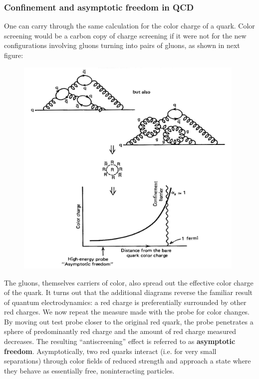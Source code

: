 \documentclass[TheoreticalPhy_ModB.tex]{subfiles}
\begin{document}
\subsubsection{Confinement and asymptotic freedom in QCD}

One can carry through the same calculation for the color charge of a quark. Color screening would be a carbon copy of charge screening if it were not for the new configurations involving gluons turning into pairs of gluons, as shown in next figure:

\begin{figure}[H]
\centering
\includegraphics[width=11cm]{img/Running-coupling-constant-QCD.jpg}
\end{figure}

The gluons, themselves carriers of color, also spread out the effective color charge of the quark. It turns out that the additional diagrams reverse the familiar result of quantum electrodynamics: a red charge is preferentially surrounded by other red charges. We now repeat the measure made with the probe for color changes. By moving out test probe closer to the original red quark, the probe penetrates a sphere of predominantly red charge and the amount of red charge measured decreases. The resulting ``antiscreening'' effect is referred to as \textbf{asymptotic freedom}. Asymptotically, two red quarks interact (i.e. for very small separations) through color fields of reduced strength and approach a state where they behave as essentially free, noninteracting particles. 
\end{document}
